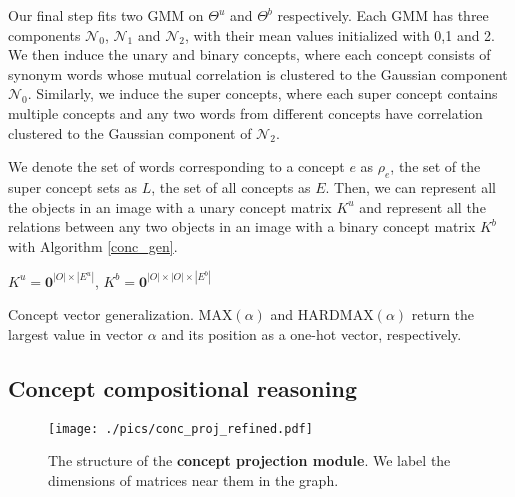 \documentclass[10pt,twocolumn,letterpaper]{article}
\begin{document}
Our final step fits two GMM on $\Theta^u$ and $\Theta^b$ respectively. Each GMM has three components $\mathcal{N}_0$, $\mathcal{N}_1$ and $\mathcal{N}_2$, with their mean values initialized with 0,1 and 2. 
We then induce the unary and binary concepts, where each concept consists of synonym words whose mutual correlation is clustered to the Gaussian component $\mathcal{N}_0$. 
Similarly, we induce the super concepts, where each super concept contains multiple concepts and any two words from different concepts have correlation clustered to the Gaussian component of $\mathcal{N}_2$.

We denote the set of words corresponding to a concept $e$ as $\rho_e$, the set of the super concept sets as $L$, the set of all concepts as $E$. Then, we can represent all the objects in an image with a unary concept matrix $K^u$ and represent all the relations between any two objects in an image with a binary concept matrix $K^b$ with Algorithm \ref{conc_gen}.

\begin{algorithm}[t]
\small
\SetAlgoLined
{}
 $K^u=\textbf{0}^{|O| \times |E^u|}$, $K^b=\textbf{0}^{|O| \times |O| \times |E^b|}$\\
 \caption{\small{Concept vector generalization. MAX$(\alpha)$ and HARDMAX$(\alpha)$ return the largest value in vector $\alpha$ and its position as a one-hot vector, respectively.}}
 \label{conc_gen}
\end{algorithm}

\vspace{-1mm}
\subsection{Concept compositional reasoning}
\vspace{-1mm}
\label{ssec:concept_reasoning}
\begin{figure}
\centering
\texttt{[image: ./pics/conc\_proj\_refined.pdf]}
\caption{The structure of the \textbf{concept projection module}. We label the dimensions of matrices near them in the graph.}
\label{conc_proj}
\vspace{-6mm}
\end{figure}
\end{document}
